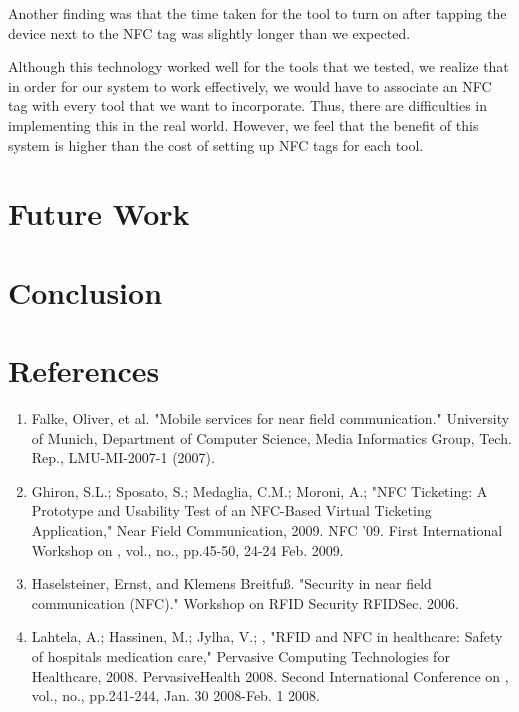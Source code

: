 \documentclass{sigchi}
\begin{document}
Another finding was that the time taken for the tool to turn on after tapping the device next to the NFC tag was slightly longer than we expected. 

Although this technology worked well for the tools that we tested, we realize that in order for our system to work effectively, we would have to associate an NFC tag with every tool that we want to incorporate. Thus, there are difficulties in implementing this in the real world. However, we feel that the benefit of this system is higher than the cost of setting up NFC tags for each tool.

\section{Future Work}


\section{Conclusion}



\section{References}

\begin{enumerate}
\item Falke, Oliver, et al. "Mobile services for near field communication." University of Munich, Department of Computer Science, Media Informatics Group, Tech. Rep., LMU-MI-2007-1 (2007).

\item Ghiron, S.L.; Sposato, S.; Medaglia, C.M.; Moroni, A.; "NFC Ticketing: A Prototype and Usability Test of an NFC-Based Virtual Ticketing Application," Near Field Communication, 2009. NFC '09. First International Workshop on , vol., no., pp.45-50, 24-24 Feb. 2009.

\item Haselsteiner, Ernst, and Klemens Breitfuß. "Security in near field communication (NFC)." Workshop on RFID Security RFIDSec. 2006.

\item Lahtela, A.; Hassinen, M.; Jylha, V.; , "RFID and NFC in healthcare: Safety of hospitals medication care," Pervasive Computing Technologies for Healthcare, 2008. PervasiveHealth 2008. Second International Conference on , vol., no., pp.241-244, Jan. 30 2008-Feb. 1 2008.
\end{enumerate}
\end{document}

